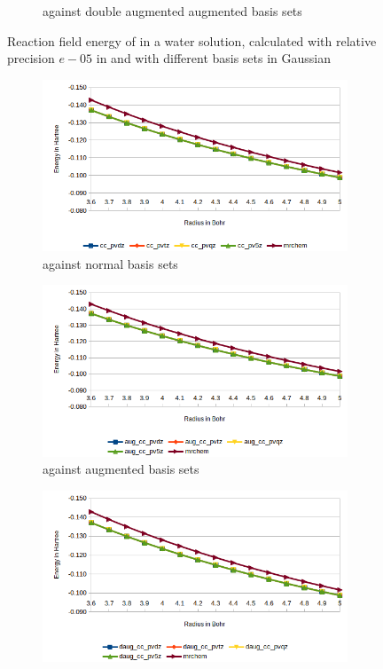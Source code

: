 \documentclass[../Thesis.tex]{subfiles}
\begin{document}
\begin{figure}[hb!]
\begin{subfigure}[b]{0.75\linewidth}
    \caption{\mrchem against double augmented augmented basis sets}
  \end{subfigure}
  \caption[Reaction field energy of ]{Reaction field energy of  in a water solution, calculated with relative precision $e-05$ in \mrchem
  and with different basis sets in Gaussian}
  \label{fig:watEnergyplots}
\end{figure}

\begin{figure}[h!]
  \centering
  \begin{subfigure}[b]{0.75\linewidth}
    \includegraphics[width=\linewidth]{img/Erlip.png}
    \caption{\mrchem against normal basis sets}
  \end{subfigure}
  \begin{subfigure}[b]{0.75\linewidth}
    \includegraphics[width=\linewidth]{img/Erauglip.png}
    \caption{\mrchem against augmented basis sets}
  \end{subfigure}
  \begin{subfigure}[b]{0.75\linewidth}
    \includegraphics[width=\linewidth]{img/Erdauglip.png}

\end{subfigure}
\end{figure}
\end{document}
